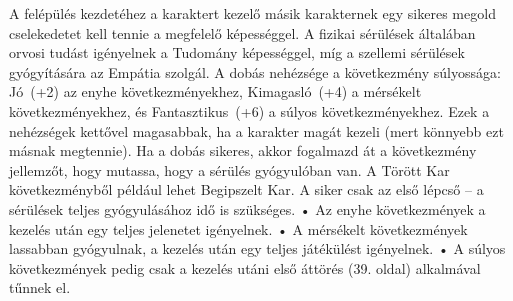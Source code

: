 \documentclass[oneside]{book}
\begin{document}
A felépülés kezdetéhez a karaktert kezelő másik karakternek egy sikeres megold cselekedetet kell tennie a megfelelő képességgel. A fizikai sérülések általában orvosi tudást igényelnek a Tudomány képességgel, míg a szellemi sérülések gyógyítására az Empátia szolgál. A dobás nehézsége a következmény súlyossága: Jó~(+2) az enyhe következményekhez, Kimagasló~(+4) a mérsékelt következményekhez, és Fantasztikus~(+6) a súlyos következményekhez. Ezek a nehézségek kettővel magasabbak, ha a karakter magát kezeli (mert könnyebb ezt másnak megtennie).
Ha a dobás sikeres, akkor fogalmazd át a következmény jellemzőt, hogy mutassa, hogy a sérülés gyógyulóban van. A Törött Kar következményből például lehet Begipszelt Kar.
A siker csak az első lépcső – a sérülések teljes gyógyulásához idő is szükséges.
    • Az enyhe következmények a kezelés után egy teljes jelenetet igényelnek.
    • A mérsékelt következmények lassabban gyógyulnak, a kezelés után egy teljes játékülést igényelnek.
    • A súlyos következmények pedig csak a kezelés utáni első áttörés (39. oldal) alkalmával tűnnek el.
\end{document}
